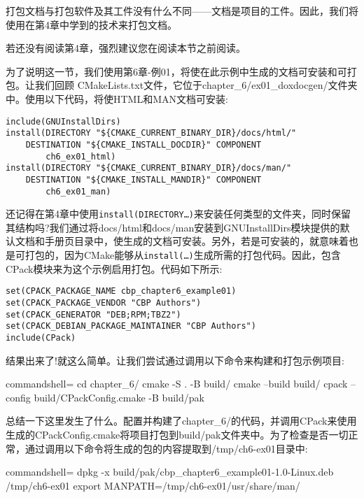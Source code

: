 打包文档与打包软件及其工件没有什么不同——文档是项目的工件。因此，我们将使用在第4章中学到的技术来打包文档。

\begin{tcolorbox}[colback=webgreen!5!white,colframe=webgreen!75!black,title=Note]
若还没有阅读第4章，强烈建议您在阅读本节之前阅读。
\end{tcolorbox}

为了说明这一节，我们使用第6章-例01，将使在此示例中生成的文档可安装和可打包。让我们回顾 CMakeLists.txt文件，它位于chapter\_6/ex01\_doxdocgen/文件夹中。使用以下代码，将使HTML和MAN文档可安装:

\begin{lstlisting}[style=styleCMake]
include(GNUInstallDirs)
install(DIRECTORY "${CMAKE_CURRENT_BINARY_DIR}/docs/html/"
	DESTINATION "${CMAKE_INSTALL_DOCDIR}" COMPONENT
		ch6_ex01_html)
install(DIRECTORY "${CMAKE_CURRENT_BINARY_DIR}/docs/man/"
	DESTINATION "${CMAKE_INSTALL_MANDIR}" COMPONENT
		ch6_ex01_man)
\end{lstlisting}

还记得在第4章中使用\texttt{install(DIRECTORY…)}来安装任何类型的文件夹，同时保留其结构吗?我们通过将docs/html和docs/man安装到GNUInstallDirs模块提供的默认文档和手册页目录中，使生成的文档可安装。另外，若是可安装的，就意味着也是可打包的，因为CMake能够从\texttt{install(…)}生成所需的打包代码。因此，包含CPack模块来为这个示例启用打包。代码如下所示:

\begin{lstlisting}[style=styleCMake]
set(CPACK_PACKAGE_NAME cbp_chapter6_example01)
set(CPACK_PACKAGE_VENDOR "CBP Authors")
set(CPACK_GENERATOR "DEB;RPM;TBZ2")
set(CPACK_DEBIAN_PACKAGE_MAINTAINER "CBP Authors")
include(CPack)
\end{lstlisting}

结果出来了!就这么简单。让我们尝试通过调用以下命令来构建和打包示例项目:

\begin{tcblisting}{commandshell={}}
cd chapter_6/
cmake -S . -B build/
cmake --build build/
cpack --config build/CPackConfig.cmake -B build/pak
\end{tcblisting}

总结一下这里发生了什么。配置并构建了chapter\_6/的代码，并调用CPack来使用生成的CPackConfig.cmake将项目打包到build/pak文件夹中。为了检查是否一切正常，通过调用以下命令将生成的包的内容提取到/tmp/ch6-ex01目录中:

\begin{tcblisting}{commandshell={}}
dpkg -x build/pak/cbp_chapter6_example01-1.0-Linux.deb
  /tmp/ch6-ex01
export MANPATH=/tmp/ch6-ex01/usr/share/man/
\end{tcblisting}

